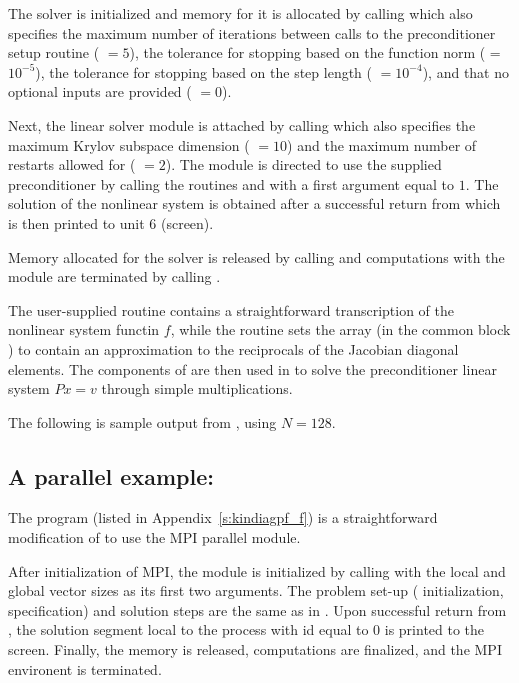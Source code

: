 The {\kinsol} solver is initialized and memory for it is allocated by
calling  which also specifies the maximum number of 
iterations between calls to the preconditioner setup routine ( $=5$),
the tolerance for stopping based on the function norm ( = $10^{-5}$),
the tolerance for stopping based on the step length ( $=10^{-4}$),
and that no optional inputs are provided ( $=0$).

Next, the {\kinspgmr} linear solver module is attached by calling  
which also specifies the maximum Krylov subspace dimension ( $=10$) and the
maximum number of restarts allowed for {\spgmr} ( $=2$).
The {\kinspgmr} module is directed to use the supplied preconditioner by 
calling the routines  and  with
a first argument equal to $1$. The solution of the nonlinear system is obtained after
a successful return from  which is then printed to unit 6 (screen).

Memory allocated for the {\kinsol} solver is released by calling  and
computations with the {\nvecs} module are terminated by calling .

The user-supplied routine  contains a straightforward transcription
of the nonlinear system functin $f$, while the routine  sets the
array  (in the common block ) to contain an approximation to 
the reciprocals of the Jacobian diagonal elements. The components of  are
then used in  to solve the preconditioner linear system $Px=v$
through simple multiplications.

The following is sample output from , using $N = 128$.



\subsection{A parallel example: }\label{ss:kindiagpf}

The program  (listed in Appendix~\ref{s:kindiagpf_f}) is a
straightforward modification of  to use the MPI parallel
{\nvecp} module.

After initialization of MPI, the {\nvecp} module is initialized by calling
 with the local and global vector sizes as its first two
arguments.
The problem set-up ({\kinsol} initialization, {\kinspgmr} specification) and
solution steps are the same as in . 
Upon successful return from , the solution segment local to 
the process with id equal to $0$ is printed to the screen.
Finally, the {\kinsol} memory is released, {\nvecp} computations are 
finalized, and the MPI environent is terminated. 

